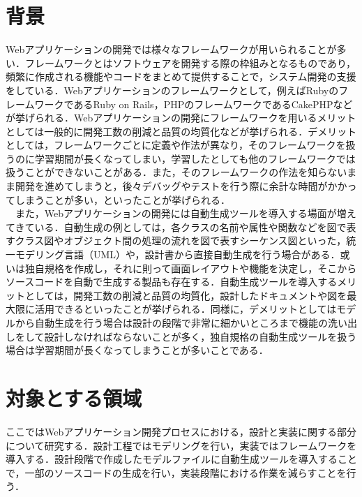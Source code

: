 \documentclass{funthesis}
\begin{document}

\section{背景} %

Webアプリケーションの開発では様々なフレームワークが用いられることが多い．フレームワークとはソフトウェアを開発する際の枠組みとなるものであり，頻繁に作成される機能やコードをまとめて提供することで，システム開発の支援をしている．Webアプリケーションのフレームワークとして，例えばRubyのフレームワークであるRuby on Rails，PHPのフレームワークであるCakePHPなどが挙げられる．Webアプリケーションの開発にフレームワークを用いるメリットとしては一般的に開発工数の削減と品質の均質化などが挙げられる．デメリットとしては，フレームワークごとに定義や作法が異なり，そのフレームワークを扱うのに学習期間が長くなってしまい，学習したとしても他のフレームワークでは扱うことができないことがある．また，そのフレームワークの作法を知らないまま開発を進めてしまうと，後々デバッグやテストを行う際に余計な時間がかかってしまうことが多い，といったことが挙げられる．\\
　また，Webアプリケーションの開発には自動生成ツールを導入する場面が増えてきている．自動生成の例としては，各クラスの名前や属性や関数などを図で表すクラス図やオブジェクト間の処理の流れを図で表すシーケンス図といった，統一モデリング言語（UML）や，設計書から直接自動生成を行う場合がある．或いは独自規格を作成し，それに則って画面レイアウトや機能を決定し，そこからソースコードを自動で生成する製品も存在する．自動生成ツールを導入するメリットとしては，開発工数の削減と品質の均質化，設計したドキュメントや図を最大限に活用できるといったことが挙げられる．同様に，デメリットとしてはモデルから自動生成を行う場合は設計の段階で非常に細かいところまで機能の洗い出しをして設計しなければならないことが多く，独自規格の自動生成ツールを扱う場合は学習期間が長くなってしまうことが多いことである．\\

\section{対象とする領域}
ここではWebアプリケーション開発プロセスにおける，設計と実装に関する部分について研究する．設計工程ではモデリングを行い，実装ではフレームワークを導入する．設計段階で作成したモデルファイルに自動生成ツールを導入することで，一部のソースコードの生成を行い，実装段階における作業を減らすことを行う．
\end{document}
